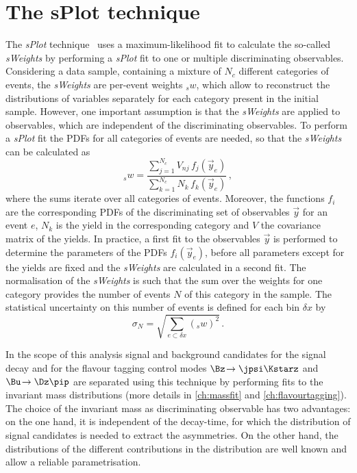 \section{The sPlot technique}
\label{sec:splot}

The \emph{sPlot} technique~\cite{Pivk:2004ty} uses a maximum-likelihood fit to calculate the so-called \emph{sWeights} by performing a \emph{sPlot} fit to one or multiple discriminating observables.
Considering a data sample, containing a mixture of $N_c$ different categories of events, the \emph{sWeights} are per-event weights ${}_sw$, which allow to reconstruct the distributions of variables separately for each category present in the initial sample.
However, one important assumption is that the \emph{sWeights} are applied to observables, which are independent of the discriminating observables.
To perform a \emph{sPlot} fit the PDFs for all categories of events are needed, so that the \emph{sWeights} can be calculated as
\begin{equation}
{}_sw=\frac{\sum_{j=1}^{N_c}V_{nj}\,f_j(\vec{y}_e)}{\sum_{k=1}^{N_c}N_k\,f_k(\vec{y}_e)}\,,
\end{equation}
where the sums iterate over all categories of events.
Moreover, the functions $f_i$ are the corresponding PDFs of the discriminating set of observables $\vec{y}$ for an event $e$, $N_k$ is the yield in the corresponding category and $V$ the covariance matrix of the yields.
In practice, a first fit to the observables $\vec{y}$ is performed to determine the parameters of the PDFs $f_i(\vec{y}_e)$, before all parameters except for the yields are fixed and the \emph{sWeights} are calculated in a second fit.
The normalisation of the \emph{sWeights} is such that the sum over the weights for one category provides the number of events $N$ of this category in the sample.
The statistical uncertainty on this number of events is defined for each bin $\delta x$ by
\begin{equation}
\sigma_N=\sqrt{\sum_{e\subset\delta x}({}_sw)^2}\,.
\end{equation}

In the scope of this analysis signal and background candidates for the signal decay \mbox{\BdToDpi} and for the flavour tagging control modes $\Bz\!\to\jpsi\Kstarz$ and $\Bu\!\to\Dz\pip$ are separated using this technique by performing fits to the invariant mass distributions (more details in \cref{ch:massfit} and \cref{ch:flavourtagging}).
The choice of the invariant mass as discriminating observable has two advantages:
on the one hand, it is independent of the decay-time, for which the distribution of signal candidates is needed to \eg extract the \CP asymmetries.
On the other hand, the distributions of the different contributions in the distribution are well known and allow a reliable parametrisation.

